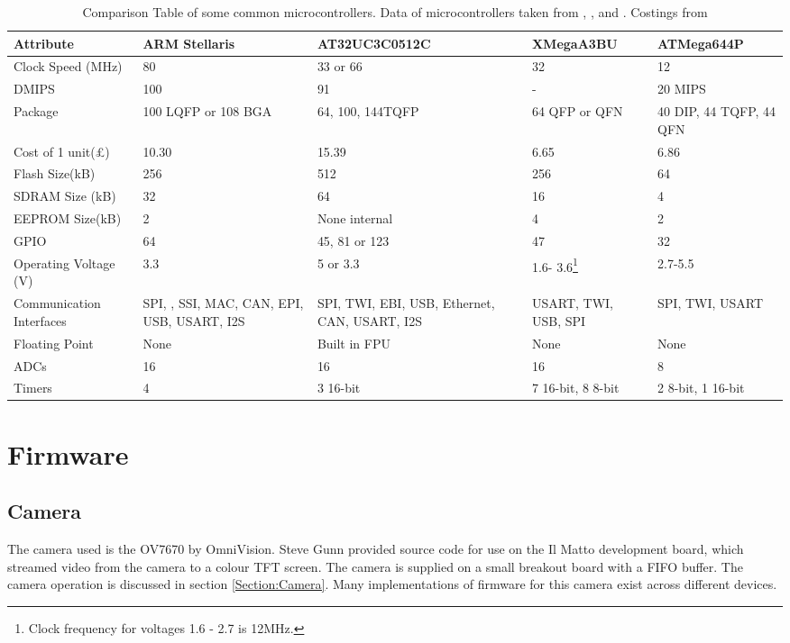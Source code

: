 \begin{table}
\centering
\begin{tabular}{|p{3.0cm}|p{2.0cm}|p{3cm}|p{2.3cm}|p{2.4cm}|}\hline
Attribute				& 	ARM Stellaris		&	AT32UC3C0512C 		&	XMegaA3BU	&	ATMega644P 	\\	\hline
Clock Speed	(MHz)		&	80					&	33 or 66			&	32			&	12			\\
DMIPS					&	100					&	91					&	-			&	20 MIPS		\\
Package					&	100 LQFP or 108 BGA	&	64, 100, 144TQFP	&	64 QFP or QFN & 40 DIP, 44 TQFP, 44 QFN \\
Cost of 1 unit(\pounds)	&	10.30				& 15.39 &	6.65	 & 6.86\\
Flash Size(kB)			&	256					&	512					&	256			&	64 \\
SDRAM Size (kB)			&	32					&	64					&	16			&	4	\\
EEPROM Size(kB)			&	2					&	None internal		&	4			&	2 	\\
GPIO					&	64					& 	45, 81 or 123		&	47			& 	32	\\
Operating Voltage (V)	&	3.3					& 	5	or 3.3			& 	1.6- 3.6\footnote{Clock frequency for voltages 1.6 - 2.7 is 12MHz.}		& 	2.7-5.5	\\
Communication Interfaces &	SPI, \itc, SSI, MAC, CAN, EPI, USB, USART, I2S	& SPI, TWI, EBI, USB, Ethernet, CAN, USART, I2S	&	USART, TWI, USB, SPI 		&	SPI, TWI, USART \\
Floating Point			&	None				&	Built in FPU		&	None		&	None		\\
ADCs					&	16					&	16					&	16			&	8			\\
Timers					&	4					&	3 16-bit			& 7 16-bit, 8 8-bit & 2 8-bit, 1 16-bit \\
\hline
\end{tabular}
\caption{Comparison Table of some common microcontrollers. Data of microcontrollers taken from \cite{Atmel:UC3C}, \cite{Atmel:644P}, \cite{Atmel:A3BU} and \cite{ARM:Stellaris}. Costings from \cite{Farnell}}
\label{tab:uCComp}
\end{table}

\section{Firmware}
\subsection{Camera}

The camera used is the OV7670 by OmniVision. Steve Gunn provided source code for use on the Il Matto development board, which streamed video from the camera to a colour TFT screen. The camera is supplied on a small breakout board with a FIFO buffer. The camera operation is discussed in section \ref{Section:Camera}. Many implementations of firmware for this camera exist across different devices. 

